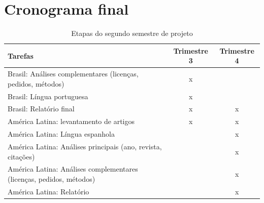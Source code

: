 \documentclass[onecolumn, A4]{article}
\begin{document}
\section{Cronograma final}
\begin{table}[h]
\caption{Etapas do segundo semestre de projeto}
\label{tab:cronograma}
\begin{tabular}{|l|c|c|}
\hline
Tarefas & Trimestre 3 & Trimestre 4 \\
\hline
Brasil: Análises complementares (licenças, pedidos, métodos) & x & \\
\hline
Brasil: Língua portuguesa & x & \\
\hline
Brasil: Relatório final & x & x \\
\hline
América Latina: levantamento de artigos & x & x \\
\hline
América Latina: Língua espanhola & & x \\
\hline
América Latina: Análises principais (ano, revista, citações) & & x \\
\hline
América Latina: Análises complementares (licenças, pedidos, métodos) & & x \\
\hline
América Latina: Relatório & & x \\
\hline
\end{tabular}
\end{table}



\end{document}

